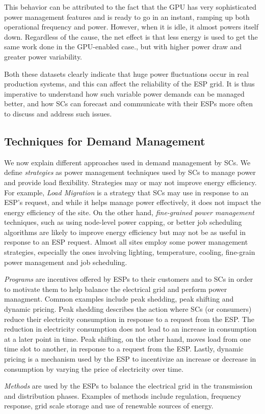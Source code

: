 This behavior can be attributed to the fact that the GPU has very sophisticated power management features and is ready to go in an instant, ramping up both operational frequency and power. However, when it is idle, it almost powers itself down.  Regardless of the cause, the net effect is that less energy is used to get the same work done in the GPU-enabled case., but with higher power draw and greater power variability.

Both these datasets clearly indicate that huge power fluctuations occur in real production systems, and this can affect the reliability of the ESP grid. It is thus imperative to understand how such variable power demands can be managed better, and how SCs can forecast and communicate with their ESPs more often to discuss and address such issues. 

\subsection{Techniques for Demand Management}
We now explain different approaches used in demand management by SCs. We define \emph{strategies} as power management techniques used by SCs to manage power and provide load flexibility. Strategies may or may not improve energy efficiency. For example, \emph{Load Migration} is a strategy that SCs may use in response to an ESP's request, and while it helps manage power effectively, it does not impact the energy efficiency of the site. On the other hand, \emph{fine-grained power management} techniques, such as using node-level power capping, or better job scheduling algorithms are likely to improve energy efficiency but may not be as useful in response to an ESP request. Almost all sites employ some power management strategies, especially the ones involving lighting, temperature, cooling, fine-grain power management and job scheduling. 

\emph{Programs} are incentives offered by ESPs to their customers and to SCs in order to motivate them to help balance the electrical grid and perform power managment. Common examples include peak shedding, peak shifting and dynamic pricing. Peak shedding describes the action where SCs (or consumers) reduce their electricity consumption in response to a request from the ESP. The reduction in electricity consumption does not lead to an increase in consumption at a later point in time. Peak shifting, on the other hand, moves load from one time slot to another, in response to a request from the ESP. Lastly, dynamic pricing is a mechanism used by the ESP to incentivize an increase or decrease in consumption by varying the price of electricity over time.

\emph{Methods} are used by the ESPs to balance the electrical grid in the transmission and distribution phases. Examples of methods include regulation, frequency response, grid scale storage and use of renewable sources of energy. 